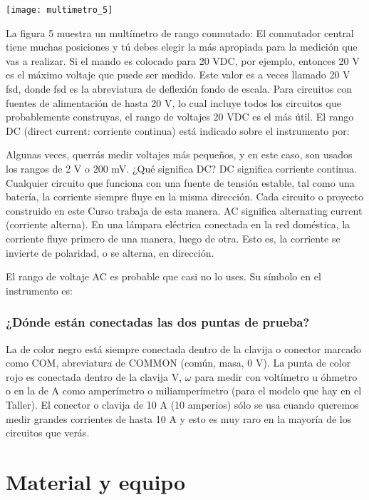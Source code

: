 \documentclass[11pt]{article}
\newenvironment{Figuras}
  {\par\medskip\noindent\minipage{\linewidth}}
  {\endminipage\par\medskip}
\begin{document}
\begin{multicols}{2}
\begin{Figuras}
	\centering
    \texttt{[image: multimetro\_5]}
    \label{fig:mesh5}
\end{Figuras}

La figura 5 muestra un multímetro de rango conmutado:
El conmutador central tiene muchas posiciones y tú debes
elegir la más apropiada para la medición que vas a realizar.
Si el mando es colocado para 20 VDC, por ejemplo, entonces
20 V es el máximo voltaje que puede ser medido. Este valor
es a veces llamado 20 V fsd, donde fsd es la abreviatura de
deflexión fondo de escala.
Para circuitos con fuentes de alimentación de hasta 20 V, lo
cual incluye todos los circuitos que probablemente
construyas, el rango de voltajes 20 VDC es el más útil. El
rango DC (direct current: corriente continua) está indicado
sobre el instrumento por:

Algunas veces, querrás medir voltajes más pequeños, y en
este caso, son usados los rangos de 2 V o 200 mV.
¿Qué significa DC? DC significa corriente continua.
Cualquier circuito que funciona con una fuente de tensión
estable, tal como una batería, la corriente siempre fluye en la
misma dirección. Cada circuito o proyecto construido en
este Curso trabaja de esta manera.
AC significa alternating current (corriente alterna). En
una lámpara eléctrica conectada en la red doméstica, la
corriente fluye primero de una manera, luego de otra. Esto
es, la corriente se invierte de polaridad, o se alterna, en
dirección.

El rango de voltaje AC es probable que casi no lo uses. Su símbolo en el instrumento es:

\subsubsection{¿Dónde están conectadas las dos puntas de prueba?}
La de color negro está siempre conectada dentro de la clavija o conector marcado como COM,
abreviatura de COMMON (común, masa, 0 V). La punta de color rojo es conectada dentro de la clavija
V, $\omega$ para medir con voltímetro u óhmetro o en la de A como amperímetro o miliamperímetro (para el
modelo que hay en el Taller). El conector o clavija de 10 A (10 amperios) sólo se usa cuando queremos
medir grandes corrientes de hasta 10 A y esto es muy raro en la mayoría de los circuitos que verás.

\section{Material y equipo}
	\begin{itemize}


\end{itemize}
\end{multicols}
\end{document}
